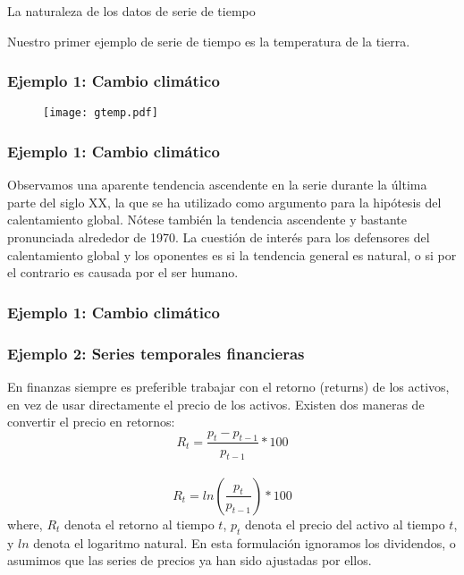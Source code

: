 \documentclass[xcolor=(list of options)]{beamer}
\begin{document}
\begin{section}{La naturaleza de los datos de serie de tiempo}
\begin{frame}
\end{frame}
\begin{frame}
Nuestro primer ejemplo de serie de tiempo es la temperatura de la tierra.
\frametitle{Ejemplo 1: Cambio clim\'atico}
\begin{figure}[t!]
\texttt{[image: gtemp.pdf]}
\end{figure}

\end{frame}

\begin{frame}
\frametitle{Ejemplo 1: Cambio clim\'atico}
Observamos una aparente tendencia ascendente en la serie durante la \'ultima parte del siglo XX, la que se ha utilizado como argumento para la hip\'otesis del calentamiento global. N\'otese tambi\'en la tendencia ascendente y bastante pronunciada alrededor de 1970. La cuesti\'on de inter\'es para los defensores del calentamiento global y los oponentes es si la tendencia general es natural, o si por el contrario es causada por el ser humano.
\end{frame}
\begin{frame}
\frametitle{Ejemplo 1: Cambio clim\'atico}


\end{frame}
\begin{frame}
\frametitle{Ejemplo 2: Series temporales financieras}
En finanzas siempre es preferible trabajar con el retorno (returns) de los activos, en vez de usar directamente el precio de los activos. Existen dos maneras de convertir el precio en retornos:
\begin{equation*}
R_t = \frac{p_t - p_{t-1}}{p_{t-1}} *100%
\end{equation*}
\\
\begin{equation*}
R_t = ln\left(\frac{p_t}{p_{t-1}}\right)*100%
\end{equation*}
where, $R_t$ denota el retorno al tiempo $t$, $p_t$ denota el precio del activo al tiempo $t$, y $ln$ denota el logaritmo natural. En esta formulaci\'on ignoramos los dividendos, o asumimos que las series de precios ya han sido ajustadas por ellos.


\end{frame}
\end{section}
\end{document}
